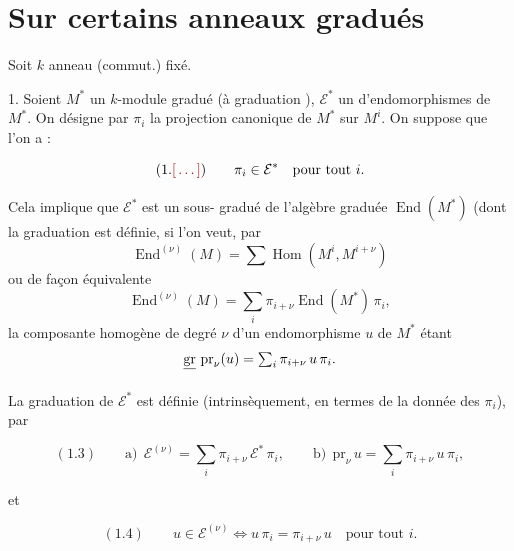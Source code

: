 \documentclass[11pt,a4paper]{article}
\begin{document}
\section{Sur certains anneaux gradués}



Soit $k$ anneau (commut.) fixé.

1. Soient  $M^{*}$ un $k$-module gradué (à graduation
\ill{}), $\mathcal{E}^{*}$ un   d'endomorphismes de $M^{*}$. On désigne par $\pi_{i}$ la projection
canonique de $M^{*}$ sur $M^{i}$.  On suppose que l'on a :

\[ (1.\ill{}) \qquad \pi_{i} \in \mathcal{E}^{*} \quad \text{pour tout } i . \]


Cela implique que $\mathcal{E}^{*}$ est un sous-
 gradué de l'algèbre graduée 
$\operatorname{End}(M^{*})$ (dont la graduation est définie, si l'on veut, par
\[ \operatorname{End}^{(\nu)}(M) = \textstyle\sum \operatorname{Hom}(M^{i}, M^{i+\nu}) \]
ou de façon équivalente
\[ \operatorname{End}^{(\nu)}(M) = \textstyle\sum_{i} \pi_{i+\nu} \operatorname{End}(M^{*})\, \pi_{i} , \]
la composante homogène de degré $\nu$ d'un endomorphisme $u$ de $M^{*}$ étant
\[ \struck{\mathrm{gr}}\ \mathrm{pr}_{\nu}(u) = \textstyle\sum_{i} \pi_{i+\nu}\, u\, \pi_{i} . \]

La graduation de $\mathcal{E}^{*}$ est définie (intrinsèquement, en termes de la
donnée des $\pi_{i}$), par

\[ (1.3) \qquad \text{a)}\ \ \mathcal{E}^{(\nu)} = \sum_{i} \pi_{i+\nu}\, \mathcal{E}^{*}\, \pi_{i} , \qquad \text{b)}\ \ \mathrm{pr}_{\nu}\, u = \sum_{i} \pi_{i+\nu}\, u\, \pi_{i} , \]

et

\[ (1.4) \qquad u \in \mathcal{E}^{(\nu)} \iff u\, \pi_{i} = \pi_{i+\nu}\, u \quad \text{pour tout } i . \]
\end{document}

